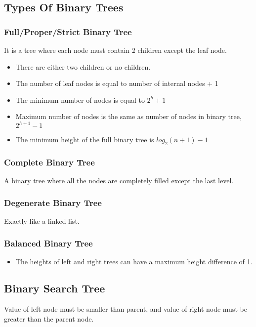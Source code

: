 \documentclass[11pt]{article}
\begin{document}
\subsection{Types Of Binary Trees}
\label{sec:org5ba312c}
\subsubsection{Full/Proper/Strict Binary Tree}
\label{sec:org7186271}
It is a tree where each node must contain 2 children except the leaf node.

\begin{itemize}
\item There are either two children or no children.
\item The number of leaf nodes is equal to number of internal nodes + 1
\item The minimum number of nodes is equal to \(2^h + 1\)
\item Maximum number of nodes is the same as number of nodes in binary tree, \(2^{h+1} - 1\)
\item The minimum height of the full binary tree is \(log_2(n+1) - 1\)
\end{itemize}
\subsubsection{Complete Binary Tree}
\label{sec:org1bba02f}
A binary tree where all the nodes are completely filled except the last level.
\subsubsection{Degenerate Binary Tree}
\label{sec:orgdd56dfa}
Exactly like a linked list.
\subsubsection{Balanced Binary Tree}
\label{sec:orgda57980}
\begin{itemize}
\item The heights of left and right trees can have a maximum height difference of 1.
\end{itemize}
\subsection{Binary Search Tree}
\label{sec:orgbc04abd}
Value of left node must be smaller than parent, and value of right node must be greater than the parent node.
\end{document}
